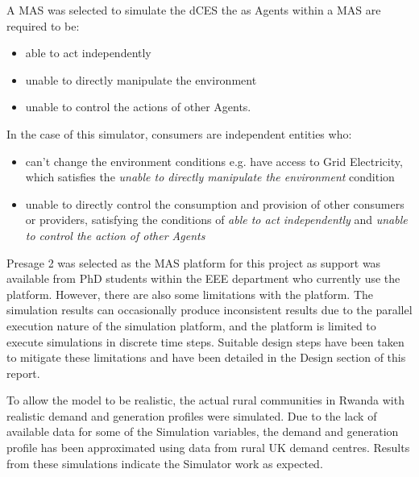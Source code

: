 A MAS was selected to simulate the dCES the as Agents within a MAS are required to be:
\begin{itemize}
	\item able to act independently
	\item unable to directly manipulate the environment
	\item unable to control the actions of other Agents. 
\end{itemize}
In the case of this simulator, consumers are independent entities who:
\begin{itemize}
 	\item can't change the environment conditions e.g. have access to Grid Electricity, which satisfies the \textit{unable to directly manipulate the environment} condition
 	\item unable to directly control the consumption and provision of other consumers or providers, satisfying the conditions of \textit{able to act independently} and \textit{unable to control the action of other Agents} 
\end{itemize}
Presage 2 was selected as the MAS platform for this project as support was available from PhD students within the EEE department who currently use the platform. However, there are also some limitations with the platform. The simulation results can occasionally produce inconsistent results due to the parallel execution nature of the simulation platform, and the platform is limited to execute simulations in discrete time steps. Suitable design steps have been taken to mitigate these limitations and have been detailed in the Design section of this report. 

To allow the model to be realistic, the actual rural communities in Rwanda with realistic demand and generation profiles were simulated. Due to the lack of available data for some of the Simulation variables, the demand and generation profile has been approximated using data from rural UK demand centres. Results from these simulations indicate the Simulator work as expected.
